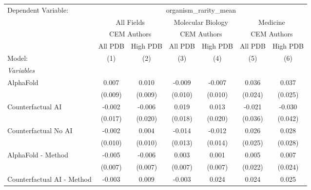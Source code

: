 \begingroup
\centering
\begin{tabular}{lcccccc}
   \tabularnewline \midrule \midrule
   Dependent Variable: & \multicolumn{6}{c}{organism\_rarity\_mean}\\
 & \multicolumn{2}{c}{All Fields} & \multicolumn{2}{c}{Molecular Biology} & \multicolumn{2}{c}{Medicine} \\
\cmidrule(lr){2-3} \cmidrule(lr){4-5} \cmidrule(lr){6-7}
 & \multicolumn{2}{c}{CEM Authors} & \multicolumn{2}{c}{CEM Authors} & \multicolumn{2}{c}{CEM Authors} \\
\cmidrule(lr){2-3} \cmidrule(lr){4-5} \cmidrule(lr){6-7}
 & \multicolumn{1}{c}{All PDB} & \multicolumn{1}{c}{High PDB} & \multicolumn{1}{c}{All PDB} & \multicolumn{1}{c}{High PDB} & \multicolumn{1}{c}{All PDB} & \multicolumn{1}{c}{High PDB} \\
\cmidrule(lr){2-2} \cmidrule(lr){3-3} \cmidrule(lr){4-4} \cmidrule(lr){5-5} \cmidrule(lr){6-6} \cmidrule(lr){7-7}
   Model:                                                     & (1)     & (2)     & (3)     & (4)          & (5)     & (6)\\  
   \midrule
   \emph{Variables}\\
   AlphaFold                                                  & 0.007   & 0.010   & -0.009  & -0.007       & 0.036   & 0.037\\   
                                                              & (0.009) & (0.009) & (0.010) & (0.010)      & (0.024) & (0.025)\\   
   Counterfactual AI                                          & -0.002  & -0.006  & 0.019   & 0.013        & -0.021  & -0.030\\   
                                                              & (0.017) & (0.020) & (0.018) & (0.020)      & (0.036) & (0.042)\\   
   Counterfactual No AI                                       & -0.002  & 0.004   & -0.014  & -0.012       & 0.026   & 0.028\\   
                                                              & (0.010) & (0.010) & (0.013) & (0.014)      & (0.025) & (0.028)\\   
   AlphaFold - Method                                         & -0.005  & -0.006  & 0.003   & 0.001        & 0.005   & 0.007\\   
                                                              & (0.007) & (0.007) & (0.007) & (0.007)      & (0.022) & (0.024)\\   
   Counterfactual AI - Method                                 & -0.003  & 0.009   & -0.003  & 0.024        & 0.024   & 0.025\\   

\end{tabular}
